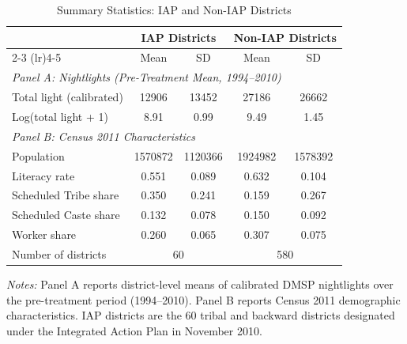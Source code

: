 \begin{table}[H]
\centering
\caption{Summary Statistics: IAP and Non-IAP Districts}
\label{tab:summary}
\begin{threeparttable}
\begin{tabular}{lcccc}
\toprule
 & \multicolumn{2}{c}{IAP Districts} & \multicolumn{2}{c}{Non-IAP Districts} \\
\cmidrule(lr){2-3} \cmidrule(lr){4-5}
 & Mean & SD & Mean & SD \\
\midrule
\multicolumn{5}{l}{\textit{Panel A: Nightlights (Pre-Treatment Mean, 1994--2010)}} \\
Total light (calibrated)            & 12906 & 13452 & 27186 & 26662 \\
Log(total light + 1)                & 8.91 & 0.99 & 9.49 & 1.45 \\
\midrule
\multicolumn{5}{l}{\textit{Panel B: Census 2011 Characteristics}} \\
Population                          & 1570872 & 1120366 & 1924982 & 1578392 \\
Literacy rate                       & 0.551 & 0.089 & 0.632 & 0.104 \\
Scheduled Tribe share               & 0.350 & 0.241 & 0.159 & 0.267 \\
Scheduled Caste share               & 0.132 & 0.078 & 0.150 & 0.092 \\
Worker share                        & 0.260 & 0.065 & 0.307 & 0.075 \\
\midrule
Number of districts                 & \multicolumn{2}{c}{60} & \multicolumn{2}{c}{580} \\
\bottomrule
\end{tabular}
\begin{tablenotes}[flushleft]
\small
\item \textit{Notes:} Panel A reports district-level means of calibrated DMSP nightlights over the pre-treatment period (1994--2010). Panel B reports Census 2011 demographic characteristics. IAP districts are the 60 tribal and backward districts designated under the Integrated Action Plan in November 2010.
\end{tablenotes}
\end{threeparttable}
\end{table}

